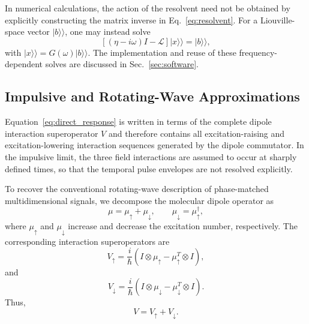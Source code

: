 In numerical calculations, the action of the resolvent need not be
obtained by explicitly constructing the matrix inverse in
Eq.~\eqref{eq:resolvent}. For a Liouville-space vector
$|b\rangle\rangle$, one may instead solve
%
\begin{equation}
\left[
(\eta-i\omega)I-\mathcal{L}
\right]
|x\rangle\rangle
=
|b\rangle\rangle ,
\label{eq:resolvent_linear_system}
\end{equation}
%
with
$|x\rangle\rangle=G(\omega)|b\rangle\rangle$.
The implementation and reuse of these frequency-dependent solves are
discussed in Sec.~\ref{sec:software}.

\subsection{Impulsive and Rotating-Wave Approximations}
\label{sec:impulsive_rwa}

Equation~\eqref{eq:direct_response} is written in terms of the complete
dipole interaction superoperator $V$ and therefore contains all
excitation-raising and excitation-lowering interaction sequences
generated by the dipole commutator. In the impulsive limit, the three
field interactions are assumed to occur at sharply defined times, so
that the temporal pulse envelopes are not resolved explicitly.

To recover the conventional rotating-wave description of phase-matched
multidimensional signals, we decompose the molecular dipole operator as
%
\begin{equation}
\mu
=
\mu_{\uparrow}
+
\mu_{\downarrow},
\qquad
\mu_{\downarrow}
=
\mu_{\uparrow}^{\dagger},
\label{eq:dipole_decomposition}
\end{equation}
%
where $\mu_{\uparrow}$ and $\mu_{\downarrow}$ increase and decrease the
excitation number, respectively. The corresponding interaction
superoperators are
%
\begin{equation}
V_{\uparrow}
=
\frac{i}{\hbar}
\left(
I\otimes\mu_{\uparrow}
-
\mu_{\uparrow}^{T}\otimes I
\right),
\label{eq:V_up}
\end{equation}
%
and
%
\begin{equation}
V_{\downarrow}
=
\frac{i}{\hbar}
\left(
I\otimes\mu_{\downarrow}
-
\mu_{\downarrow}^{T}\otimes I
\right).
\label{eq:V_down}
\end{equation}
%
Thus,
%
\begin{equation}
V
=
V_{\uparrow}
+
V_{\downarrow}.
\label{eq:V_decomposition}
\end{equation}

